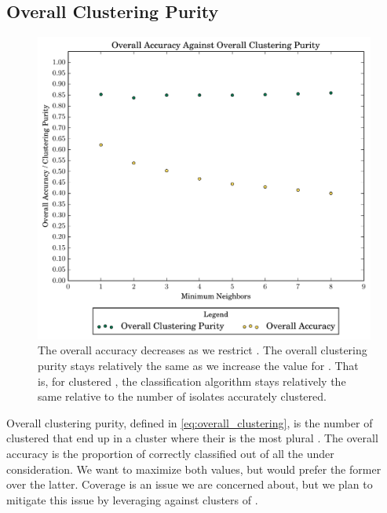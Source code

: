 \subsection{Overall Clustering Purity}
\begin{figure}[ht!]
    \centering
    \includegraphics[width=\linewidth]{figures/bs/neigh_clust_accuracy.pdf}
    \caption{The overall accuracy decreases as we restrict  \minneigh{}. 
    The overall clustering purity stays relatively the same as we increase the value for \minneigh{}. 
    That is, for clustered \isols{}, the classification algorithm stays relatively the same relative to the number of isolates accurately clustered.}
    \label{fig:overall}
\end{figure}

Overall clustering purity, defined in \eqref{eq:overall_clustering}, is the number of \isols{} clustered that end up in a cluster where their \spec{} is the most plural \spec{}. 
The overall accuracy is the proportion of correctly classified \isols{} out of all the \isols{} under consideration.
We want to maximize both values, but would prefer the former over the latter.
Coverage is an issue we are concerned about, but we plan to mitigate this issue by leveraging  \cite{DBLP:conf/bibm/McGovernDKBVG15} against clusters of \isols{}.

